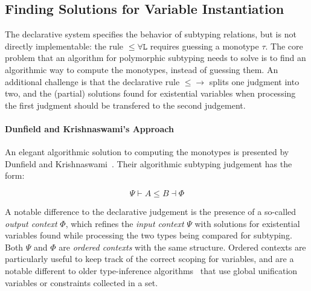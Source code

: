\begin{comment}
The conclusions of the declarative subtyping rules do not overlap with
each other, except for the judgments with a shape of
$\forall a. A \le \forall a. B$. In this case, an eager application of
Rule~$\mathtt{{\le}\forall R}$ introduces type variable into the context
earlier, which results in an easier problem than the application of
Rule~$\mathtt{{\le}\forall L}$.
\end{comment}

\subsection{Finding Solutions for Variable Instantiation}

The declarative system specifies the behavior of subtyping relations,
but is not directly implementable: the rule $\mathtt{{\le}\forall L}$
requires guessing a monotype $\tau$.
The core problem that an algorithm for polymorphic 
subtyping needs to solve is to find an algorithmic way to compute the 
monotypes, instead of guessing them. An additional challenge is that
the declarative rule $\mathtt{{\le}{\to}}$ splits one judgment
into two, and the (partial) solutions found for existential variables when
processing the first judgment should be transfered to the second judgement.

\paragraph{Dunfield and Krishnaswami's Approach}
An elegant algorithmic solution to computing the monotypes is 
presented by Dunfield and Krishnaswami~\cite{dunfield2013complete}. 
Their algorithmic subtyping judgement has the form:

\[\Psi \vdash A \le B \dashv \Phi\]

\noindent 
A notable difference to the declarative judgement is the presence of a
so-called \emph{output context} $\Phi$, which refines the \emph{input
context} $\Psi$ with solutions for existential variables found while
processing the two types being compared for subtyping. 
Both $\Psi$ and $\Phi$ are \emph{ordered contexts} with the
same structure. Ordered contexts are particularly useful to keep track
of the correct scoping for variables, and
are a notable different to older type-inference algorithms~\cite{damas1982principal} that use global
unification variables or constraints collected in a set. 

